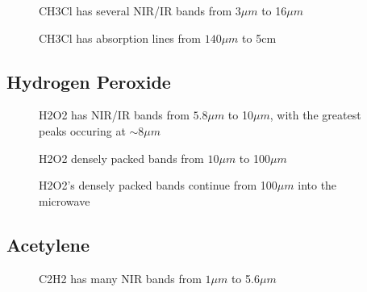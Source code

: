\documentclass[12pt]{article}
\begin{document}
\vspace*{11.5cm}
\begin{figure}[htb]
\caption{CH3Cl has several NIR/IR bands from $3\mu m$
to  16$\mu m$}
\end{figure}
\newpage


\vspace*{11.5cm}
\begin{figure}[htb]
\caption{CH3Cl has absorption lines from $140\mu m$
to  5cm}
\end{figure}
\newpage

\subsection{Hydrogen Peroxide}

\vspace*{11.5cm}
\begin{figure}[htb]
\caption{H2O2 has NIR/IR bands from $5.8\mu m$
to  10$\mu m$, with the greatest peaks occuring at $\sim 8\mu m$}
\end{figure}
\newpage


\vspace*{11.5cm}
\begin{figure}[htb]
\caption{H2O2 densely packed bands from $10\mu m$
to  100$\mu m$}
\end{figure}
\newpage


\vspace*{11.5cm}
\begin{figure}[htb]
\caption{H2O2's densely packed bands continue from
100$\mu m$ into the microwave}
\end{figure}
\newpage


\subsection{Acetylene}

\vspace*{11.5cm}
\begin{figure}[htb]
\caption{C2H2 has many NIR  bands from $1\mu m$
to 5.6$\mu m$}
\end{figure}
\newpage
\end{document}
